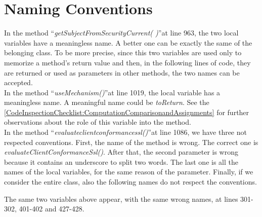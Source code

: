 \documentclass[\mainpath/main]{subfiles}
\begin{document}
\section{Naming Conventions}
\label{CodeInspectionChecklist:NamingConventions}
In the method \textquotedblleft \textit{getSubjectFromSecurityCurrent( )}\textquotedblright at line 963, the two local variables have a meaningless name. A better one can be exactly the same of the belonging class.
To be more precise, since this two variables are used only to memorize a method's return value and then, in the following lines of code, they are returned or used as parameters in other methods, the two names can be accepted.\\
In the method \textquotedblleft \textit{useMechanism(\textellipsis)}\textquotedblright at line 1019, the local variable has a meaningless name. A meaningful name could be \textit{toReturn}.
See the \autoref{CodeInspectionChecklist:ComputationComparisonandAssignments} for further observations about the role of this variable into the method.\\
In the method \textquotedblleft \textit{evaluate\textunderscore client\textunderscore conformance\textunderscore ssl(\textellipsis)}\textquotedblright at line 1086, we have three not respected conventions. First, the name of the method is wrong. The correct one is \textit{evaluateClientConformanceSsl(\textellipsis)}. After that, the second parameter is wrong because it contains an underscore to split two words.
The last one is all the names of the local variables, for the same reason of the parameter.
Finally, if we consider the entire class, also the following names do not respect the conventions.
\begin{scriptsize}
	\centerline{The same two variables above appear, with the same wrong names, at lines 301-302, 401-402 and 427-428.}
\end{scriptsize}
\end{document}
